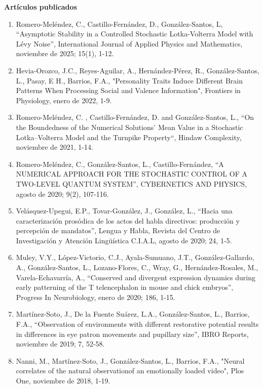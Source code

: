 \textbf{Artículos publicados}

\begin{enumerate}
\item  Romero-Meléndez, C., Castillo-Fernández, D., González-Santos, L, “Asymptotic Stability in a
Controlled Stochastic Lotka-Volterra Model with Lévy Noise”, International Journal of Applied Physics and Mathematics, 
noviembre de 2025; 15(1), 1-12.

\item Hevia-Orozco, J.C., Reyes-Aguilar, A., Hernández-Pérez, R., González-Santos, L., Pasay, E H., Barrios, F.A., 
"Personality Traits Induce Different Brain Patterns When Processing Social and Valence Information", Frontiers in Physiology, 
enero de 
2022, 1-9.

\item Romero-Meléndez, C. , Castillo-Fernández, D. and González-Santos, L., “On the Boundedness of the Numerical Solutions’ 
Mean 
Value in a Stochastic Lotka–Volterra Model and the Turnpike Property“, Hindaw Complexity, noviembre de 2021, 1-14.

\item Romero-Meléndez, C., González-Santos, L., Castillo-Fernández, “A NUMERICAL APPROACH FOR THE STOCHASTIC CONTROL OF A 
TWO-LEVEL QUANTUM SYSTEM”, CYBERNETICS AND PHYSICS, agosto de 2020; 9(2), 107-116.

\item Velásquez-Upegui, E.P., Tovar-González, J., González, L., “Hacia una caracterización prosódica de los actos del habla 
directivos: producción y percepción de mandatos”, Lengua y Habla, Revista del Centro de Investigación y Atención Lingüística 
C.I.A.L, agosto de 2020; 24, 1-5.

\item Muley, V.Y., López-Victorio, C.J., Ayala-Sumuano, J.T., González-Gallardo, A., González-Santos, L., Lozano-Flores, 
C., 
Wray, G., Hernández-Rosales, M., Varela-Echavarría, A., “Conserved and divergent expression dynamics during early 
patterning of the T telencephalon in mouse and chick embryos”, Progress In Neurobiology, enero de 2020; 186, 1-15.

\item Martínez-Soto, J., De la Fuente Suárez, L.A., González-Santos, L., Barrios, F.A., “Observation of environments with 
different restorative potential results in differences in eye patron movements and pupillary size”, IBRO Reports, noviembre 
de 2019; 7, 52-58.

\item Nanni, M., Martínez-Soto, J., González-Santos, L., Barrios, F.A., "Neural correlates of the natural observationof an 
emotionally loaded video", Plos One, noviembre de 2018, 1-19.


\end{enumerate}
